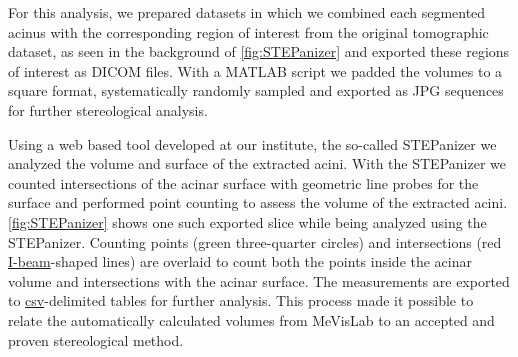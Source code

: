 \documentclass[%
	draft,
	paper=a4,%
	abstract=true,%
	]{scrartcl}
\begin{document}
For this analysis, we prepared datasets in which we combined each segmented acinus with the corresponding region of interest from the original tomographic dataset, as seen in the background of \autoref{fig:STEPanizer} and exported these regions of interest as DICOM files. With a MATLAB script we padded the volumes to a square format, systematically randomly sampled and exported as JPG sequences for further stereological analysis.

Using a web based tool developed at our institute, the so-called STEPanizer \cite[available free of charge at \url{http://stepanizer.com}]{Tschanz2011} we analyzed the volume and surface of the extracted acini. With the STEPanizer we counted intersections of the acinar surface with geometric line probes for the surface and performed point counting to assess the volume of the extracted acini. \autoref{fig:STEPanizer} shows one such exported slice while being analyzed using the STEPanizer. Counting points (green three-quarter circles) and intersections (red \href{https://encrypted.google.com/search?q=i-beam&tbm=isch}{I-beam}-shaped lines) are overlaid to count both the points inside the acinar volume and intersections with the acinar surface. The measurements are exported to \href{https://secure.wikimedia.org/wikipedia/en/w/index.php?title=Comma-separated_values&oldid=441921632}{csv}-delimited tables for further analysis. This process made it possible to relate the automatically calculated volumes from MeVisLab to an accepted and proven stereological method.
\end{document}
